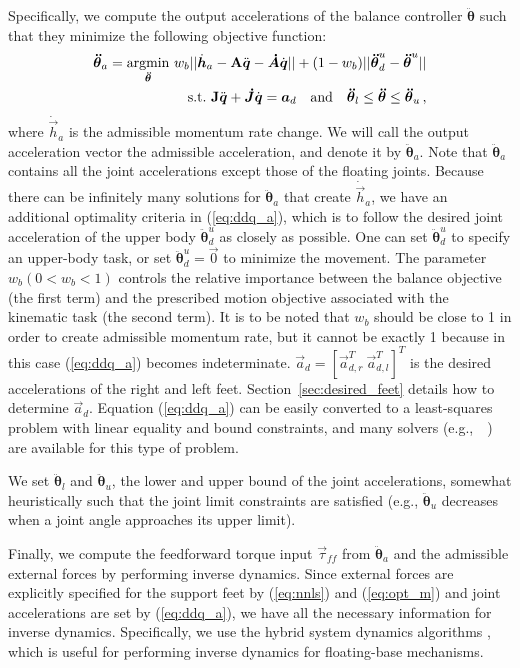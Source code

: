 \documentclass{llncs}
\newcommand{\mdJ} 	{\boldsymbol{\dot{J}}}
\newcommand{\mdA} 	{\boldsymbol{\dot{A}}}
\newcommand {\mat}[1] {{\bf #1}}
\newcommand{\mJ} {\mat{J}}
\newcommand{\vddth} {\boldsymbol{\ddot{\theta}}}
\newcommand{\vtau}{\vec{\tau}}
\newcommand{\vzero}{{\vec{0}}}
\newcommand{\va}{\vec{a}}
\newcommand{\vdh} {\dot{\vec{h}}}
\newcommand{\vdq} {\dot{\vec{q}}}
\newcommand{\vddq} {\ddot{\vec{q}}}
\begin{document}
Specifically, we compute the output accelerations of the balance controller $\vddth$ such that they minimize the following objective function:
\begin{equation}\begin{split}
		\vddth_a = \underset{\vddth}{\operatorname{argmin}}~w_b|| \vdh_a - \mat{A}\vddq - \mdA\vdq  || + (1-w_b)|| \vddth^u_d - \vddth^u || \\
		\text{s.t.~} \mJ\vddq + \mdJ\vdq = \va_d \quad \text{and} \quad \vddth_l \le \vddth \le \vddth_u  \, ,
\end{split}
\label{eq:ddq_a}
\end{equation}
where $\vdh_a$ is the admissible momentum rate change.
We will call the output acceleration vector the admissible acceleration,
and denote it by $\vddth_a$. Note that $\vddth_a$ contains all the joint 
accelerations except those of the floating joints.
Because there can be infinitely many solutions for $\vddth_a$
that create $\vdh_a$, we have an additional optimality
criteria in (\ref{eq:ddq_a}), which is to follow the desired joint acceleration of the upper body $\vddth^u_d$
as closely as possible.
One can set $\vddth^u_d$ to specify an upper-body task,
or set $\vddth^u_d=\vzero$ to minimize the movement.
The parameter $w_b (0 < w_b < 1)$ controls the relative
importance between the balance objective (the first term)
and the prescribed motion objective associated with the
kinematic task (the second term).
It is to be noted that $w_b$ should be close to 1
in order to create admissible momentum rate, but it cannot be exactly 1
because in this case (\ref{eq:ddq_a}) becomes indeterminate.
$\va_d=[\va_{d,r}^T~\va_{d,l}^T]^T$ is the desired accelerations of the
right and left feet.
Section~\ref{sec:desired_feet} details how to determine $\va_d$.
 Equation (\ref{eq:ddq_a}) can be easily converted to a
least-squares problem with linear equality and bound constraints,
and many solvers (e.g.,~\cite{lourakis04LM}~) are available for this type of problem.

We set $\vddth_l$ and $\vddth_u$, the lower and upper bound
of the joint accelerations, somewhat heuristically
such that the joint limit constraints are satisfied (e.g.,
$\vddth_u$ decreases when a joint angle approaches its upper limit).

Finally, we compute the feedforward torque input $\vtau_{ff}$ from $\vddth_a$
and the admissible external forces by performing inverse dynamics.
Since external forces are explicitly specified for the
support feet by (\ref{eq:nnls}) and (\ref{eq:opt_m})
and joint accelerations are set by (\ref{eq:ddq_a}),
we have all the necessary information for inverse dynamics.
Specifically, we use the hybrid system dynamics algorithms \cite{Featherstone87},
which is useful for performing inverse dynamics for floating-base
mechanisms.
\end{document}
